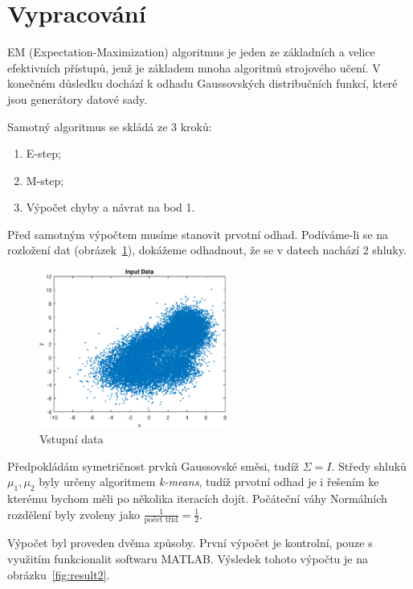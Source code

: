 \section{Vypracování}

EM (Expectation-Maximization) algoritmus je jeden ze základních a velice efektivních přístupů, jenž je základem mnoha algoritmů strojového učení.
V konečném důsledku dochází k odhadu Gaussovských distribučních funkcí, které jsou generátory datové sady.

Samotný algoritmus se skládá ze 3 kroků:

\begin{enumerate}
    \item E-step;
    \item M-step;
    \item Výpočet chyby a návrat na bod 1.
\end{enumerate}

Před samotným výpočtem musíme stanovit prvotní odhad.
Podíváme-li se na rozložení dat (obrázek~\ref{fig:result1}), dokážeme odhadnout, že se v datech nachází 2 shluky.

\begin{figure}[htb]
    \centering
    \includegraphics[width=0.55\textwidth]{graphs/fig1.eps}
    \caption{Vstupní data}
    \label{fig:result1}
\end{figure}
\FloatBarrier

Předpokládám symetričnost prvků Gaussovské směsi, tudíž \( \Sigma = I \).
Středy shluků \( \mu_1, \mu_2 \) byly určeny algoritmem \textit{k-means}, tudíž prvotní odhad je i řešením ke kterému bychom měli po několika iteracích dojít.
Počáteční váhy Normálních rozdělení byly zvoleny jako \( \frac{1}{\text{počet tříd}} = \frac{1}{2} \).

Výpočet byl proveden dvěma způsoby.
První výpočet je kontrolní, pouze s využitím funkcionalit softwaru MATLAB.
Výsledek tohoto výpočtu je na obrázku~\ref{fig:result2}.

